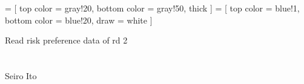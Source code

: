 

\renewcommand\Routcolor{\color{gray30}}
\newtheorem{finding}{Finding}[section]
\makeatletter
\g@addto@macro{\UrlBreaks}{\UrlOrds}
\newcommand\gobblepars{%
    \@ifnextchar\par%
        {\expandafter\gobblepars\@gobble}%
        {}}
\newenvironment{lightgrayleftbar}{%
  \def\FrameCommand{\textcolor{lightgray}{\vrule width 1zw} \hspace{10pt}}%
  \MakeFramed {\advance\hsize-\width \FrameRestore}}%
{\endMakeFramed}
\newenvironment{palepinkleftbar}{%
  \def\FrameCommand{\textcolor{palepink}{\vrule width 1zw} \hspace{10pt}}%
  \MakeFramed {\advance\hsize-\width \FrameRestore}}%
{\endMakeFramed}
\makeatother
\usepackage{caption}
\usepackage{setspace}
\usepackage{framed}
\def\pgfsysdriver{pgfsys-dvipdfm.def}
\usepackage{tikz}
\usetikzlibrary{calc, arrows, decorations, decorations.pathreplacing, backgrounds}
\usepackage{adjustbox}
 =
[
top color = gray!20, bottom color = gray!50, thick
]
 =
[
top color = blue!1, bottom color = blue!20, draw = white
]



\setlength{\baselineskip}{12pt}










\hfil Read risk preference data of rd 2\\

\hfil\MonthDY\\
\hfil{\footnotesize\currenttime}\\

\hfil Seiro Ito

\setcounter{tocdepth}{3}

